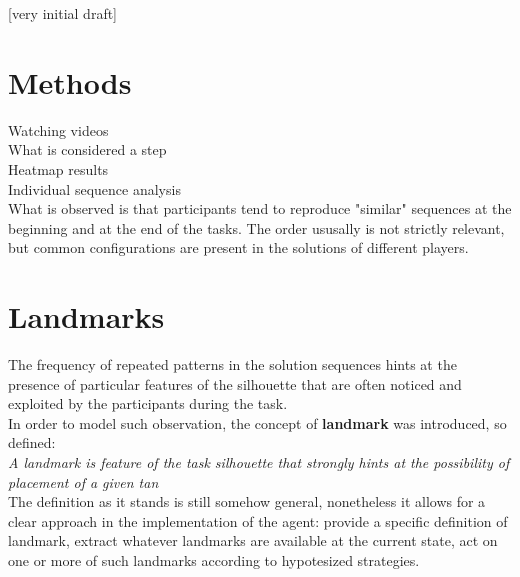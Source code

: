 \documentclass[a4paper,singleside,12pt]{report} %
\begin{document}
	
	[very initial draft]
   
	\section*{Methods}
	Watching videos\\
	What is considered a step\\
	Heatmap results \\
	Individual sequence analysis \\ 
	What is observed is that participants tend to reproduce "similar" sequences at the beginning and
	at the end of the tasks. The order ususally is not strictly relevant, but common configurations
	are present in the solutions of different players.

	\section*{Landmarks}
	The frequency of repeated patterns in the solution sequences hints at the presence of particular
	features of the silhouette that are often noticed and exploited by the participants during the
	task.\\
	In order to model such observation, the concept of \textbf{landmark} was introduced, so defined:\\
	\textit{A landmark is feature of the task silhouette that strongly hints at the possibility of
	placement of a given tan}\\
	The definition as it stands is still somehow general, nonetheless it allows for a clear
	approach in the implementation of the agent: provide a specific definition of landmark, extract
	whatever landmarks are available at the current state, act on one or more of such landmarks
	according to hypotesized strategies.\\
\end{document}
